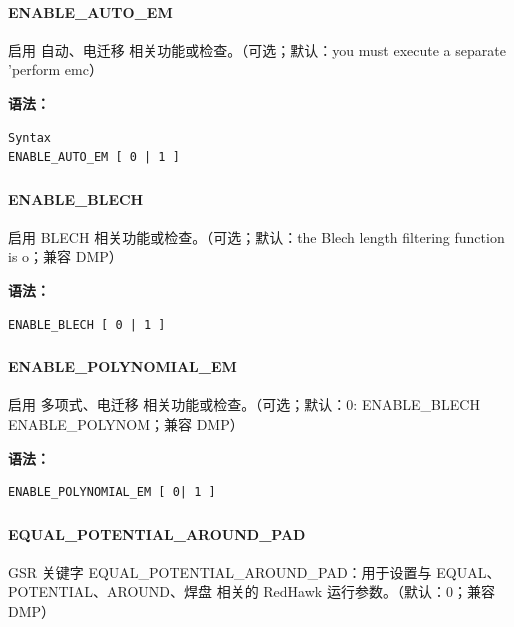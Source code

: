 \paragraph*{ENABLE_AUTO_EM}

启用 自动、电迁移 相关功能或检查。（可选；默认：you must execute a separate 'perform emc）

\textbf{语法：}
\begin{lstlisting}
Syntax
ENABLE_AUTO_EM [ 0 | 1 ]
\end{lstlisting}

\subsubsection{}
\paragraph*{ENABLE_BLECH}

启用 BLECH 相关功能或检查。（可选；默认：the Blech length filtering function is o；兼容 DMP）

\textbf{语法：}
\begin{lstlisting}
ENABLE_BLECH [ 0 | 1 ]
\end{lstlisting}

\subsubsection{}
\paragraph*{ENABLE_POLYNOMIAL_EM}

启用 多项式、电迁移 相关功能或检查。（可选；默认：0: ENABLE_BLECH           ENABLE_POLYNOM；兼容 DMP）

\textbf{语法：}
\begin{lstlisting}
ENABLE_POLYNOMIAL_EM [ 0| 1 ]
\end{lstlisting}

\subsubsection{}
\paragraph*{EQUAL_POTENTIAL_AROUND_PAD}

GSR 关键字 EQUAL_POTENTIAL_AROUND_PAD：用于设置与 EQUAL、POTENTIAL、AROUND、焊盘 相关的 RedHawk 运行参数。（默认：0；兼容 DMP）

